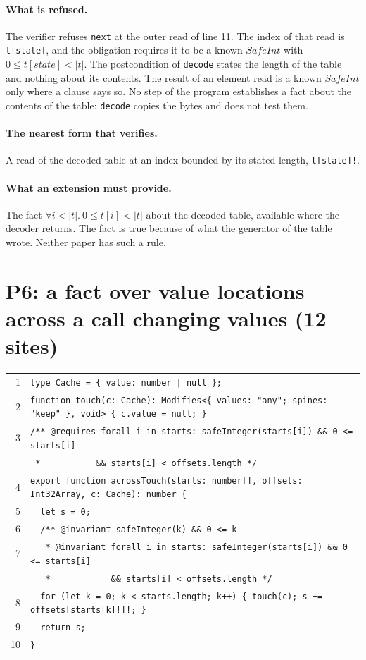 \documentclass[10pt,a4paper]{article}
\theoremstyle{definition}
\theoremstyle{remark}
\newcommand{\len}[1]{|#1|}
\newcommand{\code}[1]{\texttt{#1}}
\newcommand{\entry}[1]{\paragraph{#1.}}
\begin{document}
\entry{What is refused} The verifier refuses \code{next} at the outer read
of line 11. The index of that read is \code{t[state]}, and the
obligation requires it to be a known $\mathit{SafeInt}$ with
$0\le t[\mathit{state}]<\len{t}$. The
postcondition of \code{decode} states the length of the table and
nothing about its contents. The result of an element read is a known
$\mathit{SafeInt}$ only where a clause says so. No step of
the program establishes a fact about the contents of the table:
\code{decode} copies the bytes and does not test them.

\entry{The nearest form that verifies} A read of the decoded table at an index bounded by its
stated length, \code{t[state]!}.

\entry{What an extension must provide} The fact $\forall i<\len{t}.\ 0\le t[i]<\len{t}$
about the decoded table, available where the decoder returns. The fact
is true because of what the generator of the table wrote. Neither paper has such a rule.

\section{P6: a fact over value locations across a call changing values (12 sites)}

{\footnotesize
\begin{tabular}{@{}r@{\hspace{1em}}l@{}}
1 & \code{type Cache = \{ value: number | null \};} \\
2 & \code{function touch(c: Cache): Modifies<\{ values: "any"; spines: "keep" \}, void> \{ c.value = null; \}} \\
3 & \code{/** @requires forall i in starts: safeInteger(starts[i]) \&\& 0 <= starts[i]} \\
  & \code{~*~~~~~~~~~~~\&\& starts[i] < offsets.length */} \\
4 & \code{export function acrossTouch(starts: number[], offsets: Int32Array, c: Cache): number \{} \\
5 & \code{~~let s = 0;} \\
6 & \code{~~/** @invariant safeInteger(k) \&\& 0 <= k} \\
7 & \code{~~~* @invariant forall i in starts: safeInteger(starts[i]) \&\& 0 <= starts[i]} \\
  & \code{~~~*~~~~~~~~~~~~\&\& starts[i] < offsets.length */} \\
8 & \code{~~for (let k = 0; k < starts.length; k++) \{ touch(c); s += offsets[starts[k]!]!; \}} \\
9 & \code{~~return s;} \\
10 & \code{\}} \\
\end{tabular}}
\end{document}

